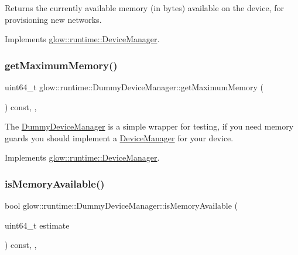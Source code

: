 \begin{DoxyReturn}{Returns}
the currently available memory (in bytes) available on the device, for provisioning new networks. 
\end{DoxyReturn}


Implements \hyperlink{classglow_1_1runtime_1_1_device_manager_a5a84ac3b23b9b6d72f50d763913ed8aa}{glow\+::runtime\+::\+Device\+Manager}.

\mbox{\label{classglow_1_1runtime_1_1_dummy_device_manager_a58bc8e9d658c8b173d27527a4251e5e0}} 
\subsubsection{\texorpdfstring{get\+Maximum\+Memory()}{getMaximumMemory()}}
{\footnotesize\ttfamily uint64\+\_\+t glow\+::runtime\+::\+Dummy\+Device\+Manager\+::get\+Maximum\+Memory (\begin{DoxyParamCaption}{ }\end{DoxyParamCaption}) const\hspace{0.3cm}{\ttfamily [inline]}, {\ttfamily [override]}, {\ttfamily [virtual]}}

The \hyperlink{classglow_1_1runtime_1_1_dummy_device_manager}{Dummy\+Device\+Manager} is a simple wrapper for testing, if you need memory guards you should implement a \hyperlink{classglow_1_1runtime_1_1_device_manager}{Device\+Manager} for your device. 

Implements \hyperlink{classglow_1_1runtime_1_1_device_manager_ad158f1c1f9f32b48927f50d48f80decb}{glow\+::runtime\+::\+Device\+Manager}.

\mbox{\label{classglow_1_1runtime_1_1_dummy_device_manager_a51b1549661977f06447122f0529d8b14}} 
\subsubsection{\texorpdfstring{is\+Memory\+Available()}{isMemoryAvailable()}}
{\footnotesize\ttfamily bool glow\+::runtime\+::\+Dummy\+Device\+Manager\+::is\+Memory\+Available (\begin{DoxyParamCaption}\item[{uint64\+\_\+t}]{estimate }\end{DoxyParamCaption}) const\hspace{0.3cm}{\ttfamily [inline]}, {\ttfamily [override]}, {\ttfamily [virtual]}}

